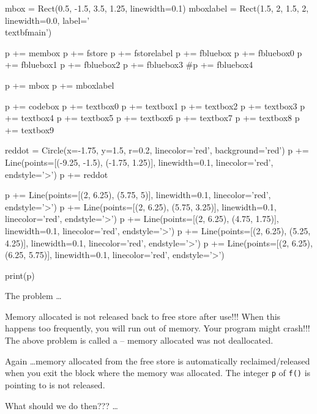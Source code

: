 \begin{python}
mbox = Rect(0.5, -1.5, 3.5, 1.25, linewidth=0.1)
mboxlabel = Rect(1.5, 2, 1.5, 2, linewidth=0.0, label='\\textbf{main}')

p += membox
p += fstore
p += fstorelabel
p += fbluebox
p += fbluebox0
p += fbluebox1
p += fbluebox2
p += fbluebox3
#p += fbluebox4

p += mbox
p += mboxlabel

p += codebox
p += textbox0
p += textbox1
p += textbox2
p += textbox3
p += textbox4
p += textbox5
p += textbox6
p += textbox7
p += textbox8
p += textbox9

reddot = Circle(x=-1.75, y=1.5, r=0.2, linecolor='red', background='red')
p += Line(points=[(-9.25, -1.5), (-1.75, 1.25)], linewidth=0.1, linecolor='red', endstyle='>')
p += reddot

p += Line(points=[(2, 6.25), (5.75, 5)], linewidth=0.1, linecolor='red', endstyle='>')
p += Line(points=[(2, 6.25), (5.75, 3.25)], linewidth=0.1, linecolor='red', endstyle='>')
p += Line(points=[(2, 6.25), (4.75, 1.75)], linewidth=0.1, linecolor='red', endstyle='>')
p += Line(points=[(2, 6.25), (5.25, 4.25)], linewidth=0.1, linecolor='red', endstyle='>')
p += Line(points=[(2, 6.25), (6.25, 5.75)], linewidth=0.1, linecolor='red', endstyle='>')

print(p)
\end{python}

The problem \ldots

Memory allocated is not released back to free store after use!!! When this happens too frequently, you will run out of memory. Your program might crash!!! The above problem is called a  -- memory allocated was not deallocated.


Again \ldots memory allocated from the free store is  automatically reclaimed/released when you exit the block where the memory was allocated. The integer \texttt{p} of \texttt{f()} is pointing to is not released.

What should we do then??? \ldots

